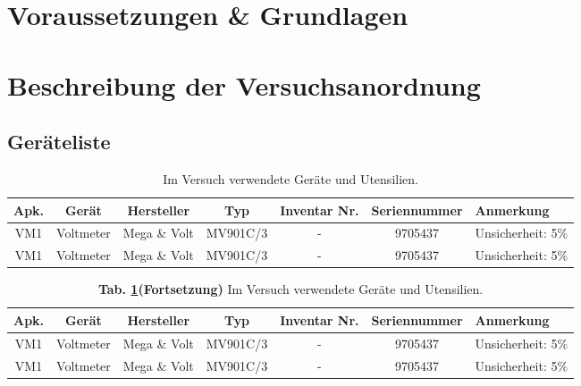 \documentclass[12pt,a4paper,twoside]{article}
\begin{document}
\section{Voraussetzungen \& Grundlagen}



\section{Beschreibung der Versuchsanordnung}


\begin{landscape}
\section{Geräteliste}

\begin{table}[H]
    \begin{tabularx}{\linewidth}{| c | c | c | c | c | c | X |}
        \hline
        \textbf{Apk.} & \textbf{Gerät} & \textbf{Hersteller} & \textbf{Typ}   & \textbf{Inventar Nr.} & \textbf{Seriennummer}  & \textbf{Anmerkung} \\
        \hline
        VM1 & Voltmeter & Mega \& Volt & MV901C/3 & - & 9705437 & Unsicherheit: 5\% \\
        \hline
        VM1 & Voltmeter & Mega \& Volt & MV901C/3 & - & 9705437 & Unsicherheit: 5\% \\
        \hline
    \end{tabularx}
    \caption{Im Versuch verwendete Geräte und Utensilien.}
    \label{tab:geraete}
\end{table}

\newpage
\begin{table}[H]
	\begin{tabularx}{\linewidth}{| c | c | c | c | c | c | X |}
		\hline
		\textbf{Apk.} & \textbf{Gerät} & \textbf{Hersteller} & \textbf{Typ}   & \textbf{Inventar Nr.} & \textbf{Seriennummer}  & \textbf{Anmerkung} \\
		\hline
		VM1 & Voltmeter & Mega \& Volt & MV901C/3 & - & 9705437 & Unsicherheit: 5\% \\
		\hline
		VM1 & Voltmeter & Mega \& Volt & MV901C/3 & - & 9705437 & Unsicherheit: 5\% \\
		\hline
	\end{tabularx}
	\caption*{\textbf{Tab. \ref{tab:geraete}(Fortsetzung)} Im Versuch verwendete Geräte und Utensilien.}
\end{table}



\end{landscape}
\end{document}

